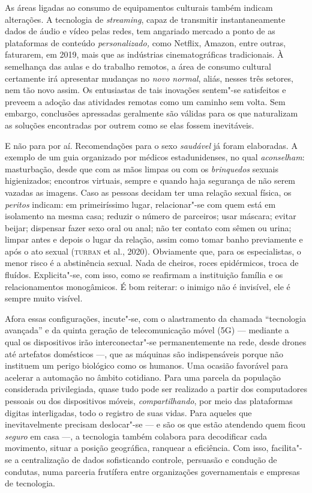 As áreas ligadas ao consumo de equipamentos culturais também indicam
alterações. A tecnologia de \emph{streaming}, capaz de transmitir
instantaneamente dados de áudio e vídeo pelas redes, tem angariado
mercado a ponto de as plataformas de conteúdo \emph{personalizado,} como
Netflix, Amazon, entre outras, faturarem, em 2019, mais que as
indústrias cinematográficas tradicionais. À semelhança das aulas e do
trabalho remotos, a área de consumo cultural certamente irá apresentar
mudanças no \emph{novo normal}, aliás, nesses três setores, nem tão novo
assim. Os entusiastas de tais inovações sentem"-se satisfeitos e preveem
a adoção das atividades remotas como um caminho sem volta. Sem embargo,
conclusões apressadas geralmente são válidas para os que naturalizam as
soluções encontradas por outrem como se elas fossem inevitáveis.

E não para por aí. Recomendações
para o sexo \emph{saudável} já foram elaboradas. A exemplo de um guia
organizado por médicos estadunidenses, no qual \emph{aconselham}:
masturbação, desde que com as mãos limpas ou com os \emph{brinquedos}
sexuais higienizados; encontros virtuais, sempre e quando haja segurança
de não serem vazadas as imagens. Caso as pessoas decidam ter uma relação
sexual física, os \emph{peritos} indicam: em primeiríssimo lugar,
relacionar"-se com quem está em isolamento na mesma casa; reduzir o
número de parceiros; usar máscara; evitar beijar; dispensar fazer sexo
oral ou anal; não ter contato com sêmen ou urina; limpar antes e depois
o lugar da relação, assim como tomar banho previamente e após o ato
sexual (\textsc{turban} et al., 2020). Obviamente que, para os especialistas, o
menor risco é a abstinência sexual. Nada de cheiros, roces epidérmicos,
troca de fluídos. Explicita"-se, com isso, como se reafirmam a
instituição família e os relacionamentos
monogâmicos. É bom reiterar: o
inimigo não é invisível, ele é sempre muito visível.

Afora essas configurações, incute"-se, com o alastramento da chamada
``tecnologia avançada'' e da quinta geração de telecomunicação móvel
(5G) --- mediante a qual os dispositivos irão interconectar"-se
permanentemente na rede, desde drones até artefatos domésticos ---, que
as máquinas são indispensáveis porque não instituem um perigo biológico
como os humanos. Uma ocasião favorável para acelerar a automação no
âmbito cotidiano. Para uma parcela da população considerada
privilegiada, quase tudo pode ser realizado a partir dos computadores
pessoais ou dos dispositivos móveis, \emph{compartilhando}, por meio das
plataformas digitas interligadas, todo o registro de suas vidas. Para
aqueles que inevitavelmente precisam deslocar"-se --- e são os que estão
atendendo quem ficou \emph{seguro} em casa ---, a tecnologia também
colabora para decodificar cada movimento, situar a posição geográfica,
ranquear a eficiência. Com isso, facilita"-se a centralização de dados
sofisticando controle, persuasão e condução de condutas, numa parceria
frutífera entre organizações governamentais e empresas de tecnologia.

